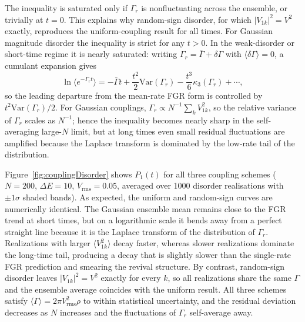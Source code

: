 \documentclass[aps,prx,reprint,showpacs,showkeys,floatfix]{revtex4-2}
\begin{document}
The inequality is saturated only if $\Gamma_r$ is nonfluctuating across the
ensemble, or trivially at $t=0$.  This explains why random-sign disorder,
for which $|V_{1k}|^2=V^2$ exactly, reproduces the uniform-coupling result
for all times.  For Gaussian magnitude disorder the inequality is strict for
any $t>0$.  In the weak-disorder or short-time regime it is nearly
saturated: writing $\Gamma_r=\bar{\Gamma}+\delta\Gamma$ with
$\langle\delta\Gamma\rangle=0$, a cumulant expansion gives
\begin{equation}
    \ln\langle e^{-\Gamma_r t}\rangle
    = -\bar{\Gamma} t + \frac{t^2}{2}\mathrm{Var}(\Gamma_r)
    - \frac{t^3}{6}\kappa_3(\Gamma_r) + \cdots,
\end{equation}
so the leading departure from the mean-rate FGR form is controlled by
$t^2\mathrm{Var}(\Gamma_r)/2$.  For Gaussian couplings,
$\Gamma_r\propto N^{-1}\sum_k V_{1k}^2$, so the relative variance of
$\Gamma_r$ scales as $N^{-1}$; hence the inequality becomes nearly sharp in
the self-averaging large-$N$ limit, but at long times even small residual
fluctuations are amplified because the Laplace transform is dominated by the
low-rate tail of the distribution.

Figure~\ref{fig:couplingDisorder} shows $P_1(t)$ for all three coupling
schemes ($N=200$, $\Delta E=10$, $V_{\mathrm{rms}}=0.05$, averaged over
1000 disorder realisations with $\pm1\sigma$ shaded bands).
As expected, the uniform and random-sign curves are numerically identical.
The Gaussian ensemble mean remains close to the FGR trend at short times,
but on a logarithmic scale it bends away from a perfect straight line
because it is the Laplace transform of the distribution of $\Gamma_r$.
Realizations with larger $\langle V_{1k}^2\rangle$ decay faster, whereas
slower realizations dominate the long-time tail, producing a decay that is
slightly slower than the single-rate FGR prediction and smearing the revival
structure.  By contrast, random-sign disorder leaves $|V_{1k}|^2=V^2$
exactly for every $k$, so all realizations share the same $\Gamma$ and the
ensemble average coincides with the uniform result.  All three schemes
satisfy $\langle\Gamma\rangle = 2\pi V_{\mathrm{rms}}^2\rho$ to within
statistical uncertainty, and the residual deviation decreases as $N$
increases and the fluctuations of $\Gamma_r$ self-average away.
\end{document}
